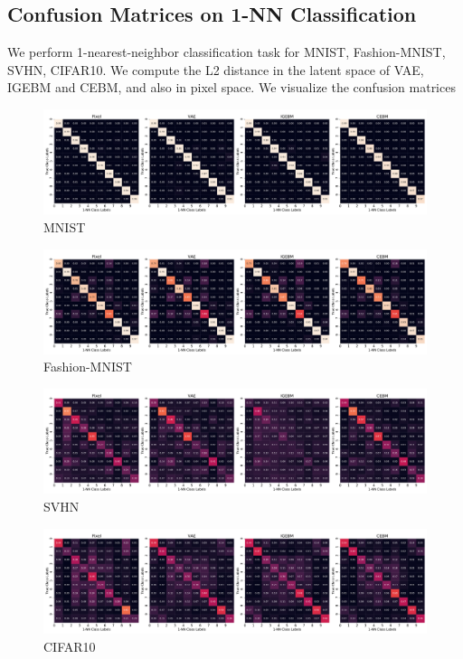 \subsection{Confusion Matrices on 1-NN Classification}
\label{appendix-sec:confuion matrices}
We perform 1-nearest-neighbor classification task for MNIST, Fashion-MNIST, SVHN, CIFAR10. We compute the L2 distance in the latent space of VAE, IGEBM and CEBM, and also in pixel space. We visualize the confusion matrices
\begin{figure}[!h]
\centering
\includegraphics[width=\linewidth]{figures/confusion_matrix_14row_mnist.pdf}
\caption{MNIST}
\label{appendix:confusion-matrices-mnist}
\end{figure}
\begin{figure}[!h]
\centering
\includegraphics[width=\linewidth]{figures/confusion_matrix_14row_fashionmnist.pdf}
\caption{Fashion-MNIST}
\label{appendix:confusion-matrices-fmnist}
\end{figure}
\vspace{-2em}
\begin{figure}[!h]
\centering
\includegraphics[width=\linewidth]{figures/confusion_matrix_14row_svhn.pdf}
\caption{SVHN}
\label{appendix:confusion-matrices-svhn}
\end{figure}
\vspace{-2em}
\begin{figure}[!h]
\centering
\includegraphics[width=\linewidth]{figures/confusion_matrix_14row_cifar10.pdf}
\caption{CIFAR10}
\label{appendix:confusion-matrices-cifar10}
\end{figure}

